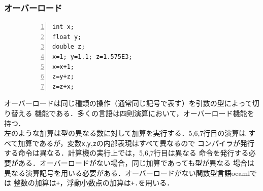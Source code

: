 \documentclass[a4j,dvipdfmx]{jbook}
\begin{document}
\subsubsection{オーバーロード}

\begin{figure}
\vspace*{-10pt}    
\begin{minipage}{.3\linewidth}
\begin{center}
\begin{Verbatim}[numbers=left]
int x;
float y;
double z;
x=1; y=1.1; z=1.575E3;
x=x+1;
z=y+z;
z=z+x;
\end{Verbatim}
\end{center}
\end{minipage}
\end{figure}

オーバーロードは同じ種類の操作（通常同じ記号で表す）を引数の型によって切り替える
機能である．多くの言語は四則演算において，オーバーロード機能を持つ．\\
左のような加算は型の異なる数に対して加算を実行する．5,6,7行目の演算は
すべて加算であるが，変数\verb|x|,\verb|y|,\verb|z|の内部表現はすべて異なるので
コンパイラが発行する命令は異なる．計算機の実行上では，5,6,7行目は異なる
命令を発行する必要がある．オーバーロードがない場合，同じ加算であっても型が異なる
場合は異なる演算記号を用いる必要がある．オーバーロードがない関数型言語ocamlでは
整数の加算は\texttt{+}，浮動小数点の加算は\texttt{+.}を用いる．

\end{document}
